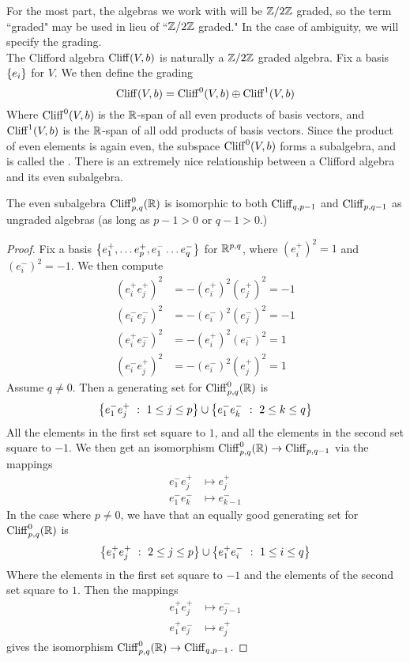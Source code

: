 %
For the most part, the algebras we work with will be $\mathbb{Z}/2\mathbb{Z}$ graded, so
the term ``graded" may be used in lieu of ``$\mathbb{Z}/2\mathbb{Z}$ graded." In the case of
ambiguity, we will specify the grading. \\
The Clifford algebra $\operatorname{Cliff}(V,b)$ is naturally a $\mathbb{Z}/2\mathbb{Z}$ graded algebra. Fix
a basis $\left\lbrace e_i \right\rbrace$ for $V$. We then define the grading
\[
\operatorname{Cliff}(V,b) = \operatorname{Cliff}^0(V,b) \oplus \operatorname{Cliff}^1(V,b)
\]
Where $\operatorname{Cliff}^0(V,b)$ is the $\mathbb{R}$-span of all even products of basis vectors,
and $\operatorname{Cliff}^1(V,b)$ is the $\mathbb{R}$-span of all odd products of basis vectors.
Since the product of even elements is again even, the subspace
$\operatorname{Cliff}^0(V,b)$ forms a subalgebra, and is called the . There is an extremely nice relationship between a Clifford algebra
and its even subalgebra.
%
\begin{thm}
The even subalgebra $\operatorname{Cliff}_{p,q}^0(\mathbb{R})$ is isomorphic to both $\operatorname{Cliff}_{q, p-1}$
and $\operatorname{Cliff}_{p,q-1}$ as ungraded algebras (as long as $p-1 > 0$ or $q-1 > 0$.)
\end{thm}
%
\begin{proof}
Fix a basis $\left\lbrace e_1^+, \ldots e_p^+, e_1^- \ldots e_q^- \right\rbrace$ for $\mathbb{R}^{p,q}$, where
$(e_i^+)^2 = 1$ and $(e_i^-)^2 = -1$. We then compute
%
\begin{align*}
(e_i^+e_j^+)^2 &= -(e_i^+)^2(e_j^+)^2 = -1 \\
(e_i^-e_j^-)^2 &= -(e_i^-)^2(e_j^-)^2 = -1 \\
(e_i^+e_j^-)^2 &= -(e_i^+)^2(e_i^-)^2 = 1 \\
(e_i^-e_j^+)^2 &= -(e_i^-)^2(e_j^+)^2 = 1
\end{align*}
%
Assume $q \neq 0$. Then a generating set for $\operatorname{Cliff}_{p,q}^0(\mathbb{R})$ is
\[
\left\lbrace e_1^-e_j^+ ~:~ 1 \leq j \leq p \right\rbrace \cup \left\lbrace e_1^-e_k^- ~:~ 2 \leq k \leq q \right\rbrace
\]
All the elements in the first set square to $1$, and all the elements in the
second set square to $-1$. We then get an isomorphism
$\operatorname{Cliff}^0_{p,q}(\mathbb{R}) \to \operatorname{Cliff}_{p,q-1}$ via the mappings
\begin{align*}
e_1^-e_j^+ &\mapsto e_j^+ \\
e_1^-e_k^- &\mapsto e_{k-1}^-
\end{align*}
In the case where $p \neq 0$, we have that an equally good generating set for
$\operatorname{Cliff}_{p,q}^0(\mathbb{R})$ is
\[
\left\lbrace e^+_1e_j^+ ~:~ 2 \leq j \leq p \right\rbrace \cup \left\lbrace e_1^+e_i^- ~:~ 1 \leq i \leq q \right\rbrace
\]
Where the elements in the first set square to $-1$ and the elements of the second
set square to $1$. Then the mappings
\begin{align*}
e_1^+e_j^+ &\mapsto e_{j-1}^- \\
e_1^+e_j^- &\mapsto e_j^+
\end{align*}
gives the isomorphism $\operatorname{Cliff}_{p,q}^0(\mathbb{R}) \to \operatorname{Cliff}_{q, p-1}$.
\end{proof}
